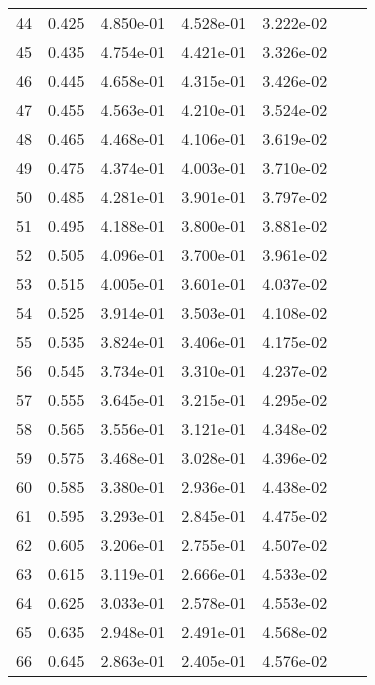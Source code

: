 \begin{table}[ht]
\begin{tabular}{rcccccc}
    44 &  0.425 &       4.850e-01 &       4.528e-01  &        3.222e-02\\ 
    45 &  0.435 &       4.754e-01 &       4.421e-01  &        3.326e-02\\ 
    46 &  0.445 &       4.658e-01 &       4.315e-01  &        3.426e-02\\ 
    47 &  0.455 &       4.563e-01 &       4.210e-01  &        3.524e-02\\ 
    48 &  0.465 &       4.468e-01 &       4.106e-01  &        3.619e-02\\ 
    49 &  0.475 &       4.374e-01 &       4.003e-01  &        3.710e-02\\ 
    50 &  0.485 &       4.281e-01 &       3.901e-01  &        3.797e-02\\ 
    51 &  0.495 &       4.188e-01 &       3.800e-01  &        3.881e-02\\ 
    52 &  0.505 &       4.096e-01 &       3.700e-01  &        3.961e-02\\ 
    53 &  0.515 &       4.005e-01 &       3.601e-01  &        4.037e-02\\ 
    54 &  0.525 &       3.914e-01 &       3.503e-01  &        4.108e-02\\ 
    55 &  0.535 &       3.824e-01 &       3.406e-01  &        4.175e-02\\ 
    56 &  0.545 &       3.734e-01 &       3.310e-01  &        4.237e-02\\ 
    57 &  0.555 &       3.645e-01 &       3.215e-01  &        4.295e-02\\ 
    58 &  0.565 &       3.556e-01 &       3.121e-01  &        4.348e-02\\ 
    59 &  0.575 &       3.468e-01 &       3.028e-01  &        4.396e-02\\ 
    60 &  0.585 &       3.380e-01 &       2.936e-01  &        4.438e-02\\ 
    61 &  0.595 &       3.293e-01 &       2.845e-01  &        4.475e-02\\ 
    62 &  0.605 &       3.206e-01 &       2.755e-01  &        4.507e-02\\ 
    63 &  0.615 &       3.119e-01 &       2.666e-01  &        4.533e-02\\ 
    64 &  0.625 &       3.033e-01 &       2.578e-01  &        4.553e-02\\ 
    65 &  0.635 &       2.948e-01 &       2.491e-01  &        4.568e-02\\ 
    66 &  0.645 &       2.863e-01 &       2.405e-01  &        4.576e-02\\ 

\end{tabular}
\end{table}
